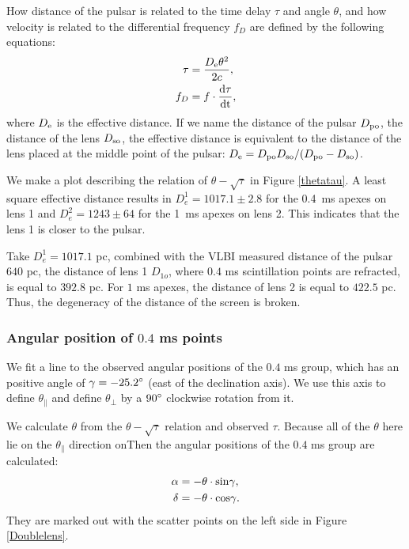 \documentclass[useAMS,usenatbib]{mn2e}
\begin{document}
How distance of the pulsar is related to the time delay $\tau$ and angle $\theta$, and how velocity is related to the differential frequency $f_D$ are defined by the following equations:
\begin{align*}
\tau &=\frac{D_{\rm e}{\theta}^2}{2c}, \\
f_D  &=f\cdot\frac{\rm d\tau}{\rm dt},
\end{align*} 
where ${D_{\rm e}}$ is the effective distance. If we name the distance of the pulsar $D_{\rm po}$, the distance of the lens $D_{\rm so}$, the effective distance is equivalent to the distance of the lens placed at the middle point of the pulsar: $D_{\rm e}={D_{\rm po} D_{\rm so}}/({D_{\rm po} - D_{\rm so}})$. 

We make a plot describing the relation of $\theta-\sqrt{\tau}$ in Figure \ref{thetatau}. A least square effective distance results in
$D_e^1=1017.1\pm 2.8$ for the  0.4\ ms apexes on lens 1 and
$D_e^2 = 1243 \pm 64$ for the 1\ ms apexes on lens 2. This indicates that the lens 1 is closer to the pulsar. 

Take $D_e^1=1017.1$ pc, combined with the VLBI measured distance of the pulsar $640$ pc, the distance of lens 1 $D_{1o}$, where $0.4$ ms scintillation points are refracted, is equal to $392.8$ pc. 
For $1$ ms apexes, the distance of lens 2 is equal to $422.5$ pc. Thus, the degeneracy of the distance of the screen is broken.

\subsubsection{Angular position of $0.4$ ms points}
We fit a line to the observed angular positions of the $0.4$ ms group, which has an positive angle of $\gamma=-25.2\degree$ (east of the declination axis). We use this axis to define $\theta_{\parallel}$ and define $\theta_{\bot}$ by a $90\degree$ clockwise rotation from it. 

We calculate $\theta$ from the $\theta-\sqrt{\tau}$ relation and observed $\tau$. Because all of the $\theta$ here lie on the $\theta_{\parallel}$ direction onThen the angular positions of the $0.4$ ms group are calculated:
\begin{align*}
{\alpha}&=-\theta \cdot {\rm sin}\gamma, \\
{\delta}&=-\theta \cdot {\rm cos}\gamma.
\end{align*}
They are marked out with the scatter points on the left side in Figure \ref{Doublelens}.
\end{document}
